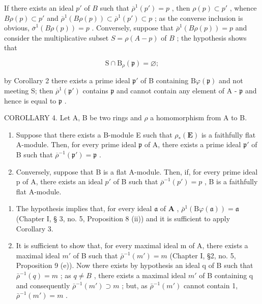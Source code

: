 If there exists an ideal \(p'\) of \(B\) such that \(\overline{\rho}^{1}(p') = p\) , then \(\rho(p) \subset p'\) , whence \(B\rho(p) \subset p'\) and \(\overline{\rho}^{1}(B\rho(p)) \subset \overline{\rho}^{1}(p') \subset p\) ; as the converse inclusion is obvious, \(\overline{\sigma}^{1}(B\rho(p)) = p\) . Conversely, suppose that \(\overline{\rho}^{1}(B\rho(p)) = p\) and consider the multiplicative subset \(S = \rho(A - p)\) of \(B\) ; the hypothesis shows that

\[
\mathrm{S} \cap \mathrm{B} _ {\rho} (\mathfrak {p}) = \varnothing ;
\]

by Corollary 2 there exists a prime ideal \(\mathfrak{p}'\) of B containing \(\mathrm{B}\varphi(\mathfrak{p})\) and not meeting S; then \(\overline{\rho}^{1}(\mathfrak{p}')\) contains \(\mathfrak{p}\) and cannot contain any element of A - \(\mathfrak{p}\) and hence is equal to \(\mathfrak{p}\) .

COROLLARY 4. Let A, B be two rings and \(\rho\) a homomorphism from A to B.

\begin{enumerate}
\def\labelenumi{(\roman{enumi})}
\item
  Suppose that there exists a B-module E such that \(\rho_{*}(\mathbf{E})\) is a faithfully flat A-module. Then, for every prime ideal \(\mathfrak{p}\) of A, there exists a prime ideal \(\mathfrak{p}'\) of B such that \(\overline{\rho}^{-1}(\mathfrak{p}') = \mathfrak{p}\) .
\item
  Conversely, suppose that B is a flat A-module. Then, if, for every prime ideal p of A, there exists an ideal \(p'\) of B such that \(\overline{\rho}^{-1}(p') = p\) , B is a faithfully flat A-module.
\end{enumerate}

\begin{enumerate}
\def\labelenumi{(\roman{enumi})}
\item
  The hypothesis implies that, for every ideal \(\mathfrak{a}\) of \(\mathbf{A}\) , \(\bar{\rho}^{1}(\mathrm{B}\varphi (\mathfrak{a})) = \mathfrak{a}\) (Chapter I, § 3, no. 5, Proposition 8 (ii)) and it is sufficient to apply Corollary 3.

\item
  It is sufficient to show that, for every maximal ideal m of A, there exists a maximal ideal \(m'\) of B such that \(\bar{\rho}^{-1}(m') = m\) (Chapter I, §2, no. 5, Proposition 9 (e)). Now there exists by hypothesis an ideal q of B such that \(\bar{\rho}^{-1}(q) = m\) ; as \(q \neq B\) , there exists a maximal ideal \(m'\) of B containing q and consequently \(\bar{\rho}^{-1}(m') \supset m\) ; but, as \(\bar{\rho}^{-1}(m')\) cannot contain 1, \(\bar{\rho}^{-1}(m') = m\) .
\end{enumerate}

